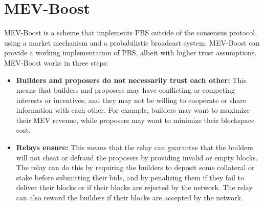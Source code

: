 \documentclass{report}
\begin{document}
\section{MEV-Boost}
MEV-Boost is a scheme that implements PBS outside of the consensus protocol, using a market mechanism and a probabilistic broadcast system. MEV-Boost can provide a working implementation of PBS, albeit with higher trust assumptions. MEV-Boost works in three steps:
\begin{itemize}
	\item \textbf{Builders and proposers do not necessarily trust each other:} This means that builders and proposers may have conflicting or competing interests or incentives, and they may not be willing to cooperate or share information with each other. For example, builders may want to maximize their MEV revenue, while proposers may want to minimize their blockspace cost.
	\item \textbf{Relays ensure:} This means that the relay can guarantee that the builders will not cheat or defraud the proposers by providing invalid or empty blocks. The relay can do this by requiring the builders to deposit some collateral or stake before submitting their bids, and by penalizing them if they fail to deliver their blocks or if their blocks are rejected by the network. The relay can also reward the builders if their blocks are accepted by the network.
\end{itemize}
\end{document}

